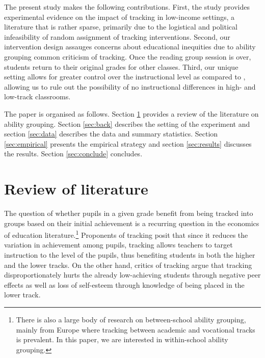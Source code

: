 \documentclass[12pt]{article}
\begin{document}
The present study makes the following contributions. First, the study provides experimental evidence on the impact of tracking in low-income settings, a literature that is rather sparse, primarily due to the logistical and political infeasibility of random assignment of tracking interventions. Second, our intervention design assauges concerns about educational inequities due to ability grouping common criticism of tracking. Once the reading group session is over, students return to their original grades for other classes. Third, our unique setting allows for greater control over the instructional level as compared to \cite{duflo2011peer}, allowing us to rule out the possibility of no instructional differences in high- and low-track classrooms.

The paper is organised as follows. Section \ref{sec:rev} provides a review of the literature on ability grouping. Section \ref{sec:back} describes the setting of the experiment and section \ref{sec:data} describes the data and summary statistics. Section \ref{sec:empirical} presents the empirical strategy and section \ref{sec:results} discusses the results. Section \ref{sec:conclude} concludes. 

\section{Review of literature}
\label{sec:rev}

The question of whether pupils in a given grade benefit from being tracked into groups based on their initial achievement is a recurring question in the economics of education literature.\footnote{There is also a large body of research on between-school ability grouping, mainly from Europe where tracking between academic and vocational tracks is prevalent. In this paper, we are interested in within-school ability grouping.} Proponents of tracking posit that since it reduces the variation in achievement among pupils, tracking allows teachers to target instruction to the level of the pupils, thus benefiting students in both the higher and the lower tracks. On the other hand, critics of tracking argue that tracking disproportionately hurts the already low-achieving students through negative peer effects as well as loss of self-esteem through knowledge of being placed in the lower track. 
\end{document}
